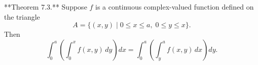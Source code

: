 **Theorem 7.3.** Suppose $f$ is a continuous complex-valued function defined on the triangle
$$
A = \{(x, y) \mid 0 \leq x \leq a, \; 0 \leq y \leq x\}.
$$
Then
$$
\int_0^a \left( \int_0^x f(x, y) \, dy \right) dx = \int_0^a \left( \int_y^a f(x, y) \, dx \right) dy.
$$
